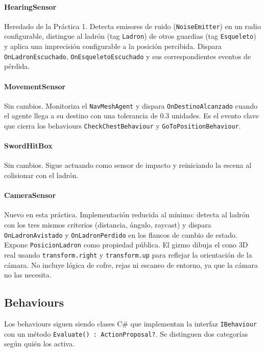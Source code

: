 \documentclass[a4paper,12pt]{article}
\begin{document}
\paragraph{HearingSensor}
Heredado de la Práctica 1. Detecta emisores de ruido (\texttt{NoiseEmitter}) en un radio configurable, distingue al ladrón (tag \texttt{Ladron}) de otros guardias (tag \texttt{Esqueleto}) y aplica una imprecisión configurable a la posición percibida. Dispara \texttt{OnLadronEscuchado}, \texttt{OnEsqueletoEscuchado} y sus correspondientes eventos de pérdida.

\paragraph{MovementSensor}
Sin cambios. Monitoriza el \texttt{NavMeshAgent} y dispara \texttt{OnDestinoAlcanzado} cuando el agente llega a su destino con una tolerancia de 0.3 unidades. Es el evento clave que cierra los behaviours \texttt{CheckChestBehaviour} y \texttt{GoToPositionBehaviour}.

\paragraph{SwordHitBox}
Sin cambios. Sigue actuando como sensor de impacto y reiniciando la escena al colisionar con el ladrón.

\paragraph{CameraSensor}
Nuevo en esta práctica. Implementación reducida al mínimo: detecta al ladrón con los tres mismos criterios (distancia, ángulo, raycast) y dispara \texttt{OnLadronAvistado} y \texttt{OnLadronPerdido} en los flancos de cambio de estado. Expone \texttt{PosicionLadron} como propiedad pública. El gizmo dibuja el cono 3D real usando \texttt{transform.right} y \texttt{transform.up} para reflejar la orientación de la cámara. No incluye lógica de cofre, rejas ni escaneo de entorno, ya que la cámara no las necesita.

\subsection*{Behaviours}

Los behaviours siguen siendo clases C\# que implementan la interfaz \texttt{IBehaviour} con un método \texttt{Evaluate() : ActionProposal?}. Se distinguen dos categorías según quién los activa.
\end{document}
